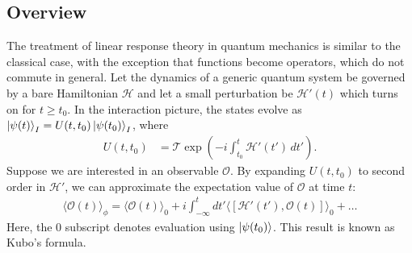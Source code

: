 \documentclass[reprint,
nofootinbib,
amsmath,amssymb,
aps]{revtex4-1}
\newcommand{\lp}{\left(}
\newcommand{\rp}{\right)}
\begin{document}
\subsection{Overview}
The treatment of linear response theory in quantum mechanics is similar to the classical case, with the exception that functions become operators, which do not commute in general. Let the dynamics of a generic quantum system be governed by a bare Hamiltonian $\mathcal{H}$ and let a small perturbation be $\mathcal{H}'(t)$ which turns on for $t\geq t_0$. In the interaction picture, the states evolve as $\ket{\psi(t)}_I = U(t,t_0) \ket{\psi(t_0)}_I$, where
\begin{align*}
U(t,t_0) 
&= \mathcal{T} \exp\lp -i \int_{t_0}^t  \mathcal{H}'(t')\,dt'\rp.
\end{align*}
Suppose we are interested in an observable $\mathcal{O}$. By expanding $U(t,t_0)$ to second order in $\mathcal{H}'$, we can approximate the expectation value of $\mathcal{O}$ at time $t$:
\begin{align}
\label{eq:time-evolution}
\langle \mathcal{O}(t) \rangle_{\phi} = \langle \mathcal{O}(t) \rangle_{0} + i \int_{-\infty}^t dt' \langle [\mathcal{H'}(t'), \mathcal{O} (t)] \rangle_{0} + \dots
\end{align}
Here, the $0$ subscript denotes evaluation using $\ket{\psi(t_0)}$.  This result is known as Kubo's formula. 
\end{document}

